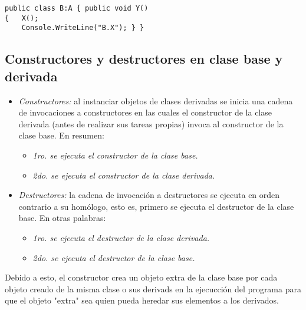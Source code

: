 \documentclass[letterpaper, 12pt]{article}
\begin{document}
\begin{justify}
\begin{itemize}
\begin{verbatim}
public class B:A { public void Y()
{   X();
    Console.WriteLine("B.X"); } }
                \end{verbatim}
        \end{itemize}
        \subsection{Constructores y destructores en clase base y derivada}
        \begin{itemize}
            \item \emph{Constructores: }al instanciar objetos de clases derivadas se inicia una cadena de invocaciones a constructores en las cuales
            el constructor de la clase derivada (antes de realizar sus tareas propias) invoca al constructor de la clase base.
            En resumen:
            \begin{itemize}
                \item \emph{1ro. se ejecuta el constructor de la clase base.}
                \item \emph{2do. se ejecuta el constructor de la clase derivada.}
            \end{itemize}
            \item \emph{Destructores: }la cadena de invocación a destructores se ejecuta en orden contrario a su homólogo, esto es, primero se ejecuta
            el destructor de la clase base.
            En otras palabras:
            \begin{itemize}
                \item \emph{1ro. se ejecuta el destructor de la clase derivada.}
                \item \emph{2do. se ejecuta el destructor de la clase base.}
            \end{itemize}
        \end{itemize}
        Debido a esto, el constructor crea un objeto extra de la clase base por cada objeto creado de la misma clase o sus derivads en la ejecucción del programa para que el
        objeto "extra" sea quien pueda heredar sus elementos a los derivados.

\end{justify}
\end{document}
